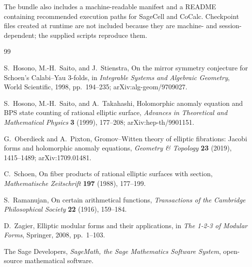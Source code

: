 \documentclass[11pt]{article}
\theoremstyle{definition}
\theoremstyle{remark}
\begin{document}
The bundle also includes a machine-readable manifest and a README containing recommended execution paths for SageCell and CoCalc.  Checkpoint files created at runtime are not included because they are machine- and session-dependent; the supplied scripts reproduce them.

\begin{thebibliography}{99}

S.~Hosono, M.-H.~Saito, and J.~Stienstra,
\newblock On the mirror symmetry conjecture for Schoen's Calabi--Yau 3-folds,
\newblock in \emph{Integrable Systems and Algebraic Geometry}, World Scientific, 1998, pp.~194--235;
\newblock arXiv:alg-geom/9709027.

S.~Hosono, M.-H.~Saito, and A.~Takahashi,
\newblock Holomorphic anomaly equation and BPS state counting of rational elliptic surface,
\newblock \emph{Advances in Theoretical and Mathematical Physics} \textbf{3} (1999), 177--208;
\newblock arXiv:hep-th/9901151.

G.~Oberdieck and A.~Pixton,
\newblock Gromov--Witten theory of elliptic fibrations: Jacobi forms and holomorphic anomaly equations,
\newblock \emph{Geometry \& Topology} \textbf{23} (2019), 1415--1489;
\newblock arXiv:1709.01481.

C.~Schoen,
\newblock On fiber products of rational elliptic surfaces with section,
\newblock \emph{Mathematische Zeitschrift} \textbf{197} (1988), 177--199.

S.~Ramanujan,
\newblock On certain arithmetical functions,
\newblock \emph{Transactions of the Cambridge Philosophical Society} \textbf{22} (1916), 159--184.

D.~Zagier,
\newblock Elliptic modular forms and their applications,
\newblock in \emph{The 1-2-3 of Modular Forms}, Springer, 2008, pp.~1--103.

The Sage Developers,
\newblock \emph{SageMath, the Sage Mathematics Software System},
\newblock open-source mathematical software.

\end{thebibliography}
\end{document}
